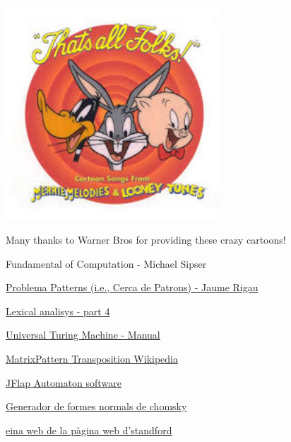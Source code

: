 \documentclass[12pt,a4paper]{report}
\begin{document}
\begin{center}
\includegraphics[width=8cm]{thatsall2}

Many thanks to Warner Bros for providing these crazy cartoons!
\end{center}


\begin{thebibliography}{9}
Fundamental of Computation - Michael Sipser

\href{http://ima.udg.edu/~rigau/FC/FC_patterns.pdf}{Problema Patterns (i.e., Cerca de Patrons) - Jaume Rigau}

\href{http://ima.udg.edu/~rigau/FC/MFAP.pdf}{Lexical analisys - part 4}

\href{http://ima.udg.edu/~rigau/FC/utm_read_me.pdf}{Universal Turing Machine - Manual}

\href{https://en.wikipedia.org/wiki/Transpose}{MatrixPattern Transposition Wikipedia}

\href{http://www.jflap.org/}{JFlap Automaton software}

\href{https://mpeveler.com/assets/content/projects/cfg2cnf.php}{Generador de formes normals de chomsky}

\href{https://web.stanford.edu/class/archive/cs/cs103/cs103.1156/tools/cfg/}{eina web de la pàgina web d’standford}

\end{thebibliography}

\printindex
\end{document}

